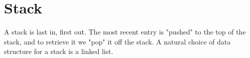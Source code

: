 \section{Stack}
A stack is last in, first out. The most recent 
entry is "pushed" to the top of the stack, and 
to retrieve it we "pop" it off the stack. 
A natural choice of data structure for a stack 
is a linked list. 
